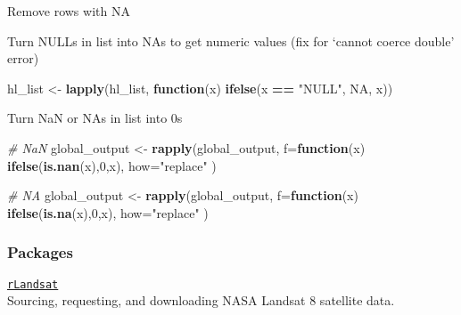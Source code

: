 \documentclass[10,portrait]{article}
\newenvironment{Shaded}{\begin{snugshade}}{\end{snugshade}}
\newcommand{\KeywordTok}[1]{\textcolor[rgb]{0.13,0.29,0.53}{\textbf{#1}}}
\newcommand{\DataTypeTok}[1]{\textcolor[rgb]{0.13,0.29,0.53}{#1}}
\newcommand{\DecValTok}[1]{\textcolor[rgb]{0.00,0.00,0.81}{#1}}
\newcommand{\StringTok}[1]{\textcolor[rgb]{0.31,0.60,0.02}{#1}}
\newcommand{\CommentTok}[1]{\textcolor[rgb]{0.56,0.35,0.01}{\textit{#1}}}
\newcommand{\OtherTok}[1]{\textcolor[rgb]{0.56,0.35,0.01}{#1}}
\newcommand{\ControlFlowTok}[1]{\textcolor[rgb]{0.13,0.29,0.53}{\textbf{#1}}}
\newcommand{\OperatorTok}[1]{\textcolor[rgb]{0.81,0.36,0.00}{\textbf{#1}}}
\newcommand{\NormalTok}[1]{#1}
\begin{document}
Remove rows with NA

\begin{Shaded}
\end{Shaded}

Turn NULLs in list into NAs to get numeric values (fix for `cannot
coerce double' error)

\begin{Shaded}
\begin{Highlighting}[]
\NormalTok{hl_list <-}\StringTok{ }\KeywordTok{lapply}\NormalTok{(hl_list, }\ControlFlowTok{function}\NormalTok{(x) }\KeywordTok{ifelse}\NormalTok{(x }\OperatorTok{==}\StringTok{ "NULL"}\NormalTok{, }\OtherTok{NA}\NormalTok{, x))}
\end{Highlighting}
\end{Shaded}

Turn NaN or NAs in list into 0s

\begin{Shaded}
\begin{Highlighting}[]
\CommentTok{# NaN}
\NormalTok{global_output <-}\StringTok{ }\KeywordTok{rapply}\NormalTok{(global_output, }\DataTypeTok{f=}\ControlFlowTok{function}\NormalTok{(x) }\KeywordTok{ifelse}\NormalTok{(}\KeywordTok{is.nan}\NormalTok{(x),}\DecValTok{0}\NormalTok{,x), }\DataTypeTok{how=}\StringTok{"replace"}\NormalTok{ )}

\CommentTok{# NA}
\NormalTok{global_output <-}\StringTok{ }\KeywordTok{rapply}\NormalTok{(global_output, }\DataTypeTok{f=}\ControlFlowTok{function}\NormalTok{(x) }\KeywordTok{ifelse}\NormalTok{(}\KeywordTok{is.na}\NormalTok{(x),}\DecValTok{0}\NormalTok{,x), }\DataTypeTok{how=}\StringTok{"replace"}\NormalTok{ )}
\end{Highlighting}
\end{Shaded}

\subsubsection{Packages}\label{packages}

\href{https://blog.socialcops.com/technology/data-science/announcing-rlandsat-landsat-8-data/}{\texttt{rLandsat}}\\
Sourcing, requesting, and downloading NASA Landsat 8 satellite data.
\end{document}
